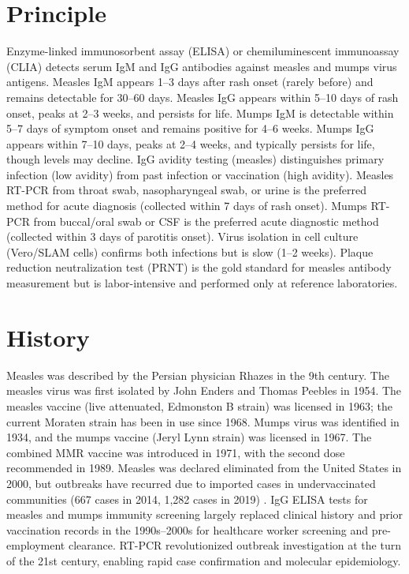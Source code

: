 \section*{Principle}
Enzyme-linked immunosorbent assay (ELISA) or chemiluminescent immunoassay (CLIA) detects serum IgM and IgG antibodies against measles and mumps virus antigens. Measles IgM appears 1--3 days after rash onset (rarely before) and remains detectable for 30--60 days. Measles IgG appears within 5--10 days of rash onset, peaks at 2--3 weeks, and persists for life. Mumps IgM is detectable within 5--7 days of symptom onset and remains positive for 4--6 weeks. Mumps IgG appears within 7--10 days, peaks at 2--4 weeks, and typically persists for life, though levels may decline. IgG avidity testing (measles) distinguishes primary infection (low avidity) from past infection or vaccination (high avidity). Measles RT-PCR from throat swab, nasopharyngeal swab, or urine is the preferred method for acute diagnosis (collected within 7 days of rash onset). Mumps RT-PCR from buccal/oral swab or CSF is the preferred acute diagnostic method (collected within 3 days of parotitis onset). Virus isolation in cell culture (Vero/SLAM cells) confirms both infections but is slow (1--2 weeks). Plaque reduction neutralization test (PRNT) is the gold standard for measles antibody measurement but is labor-intensive and performed only at reference laboratories.

\section*{History}
Measles was described by the Persian physician Rhazes in the 9th century. The measles virus was first isolated by John Enders and Thomas Peebles in 1954. The measles vaccine (live attenuated, Edmonston B strain) was licensed in 1963; the current Moraten strain has been in use since 1968. Mumps virus was identified in 1934, and the mumps vaccine (Jeryl Lynn strain) was licensed in 1967. The combined MMR vaccine was introduced in 1971, with the second dose recommended in 1989. Measles was declared eliminated from the United States in 2000, but outbreaks have recurred due to imported cases in undervaccinated communities (667 cases in 2014, 1,282 cases in 2019) \cite{rota2016measles}. IgG ELISA tests for measles and mumps immunity screening largely replaced clinical history and prior vaccination records in the 1990s--2000s for healthcare worker screening and pre-employment clearance. RT-PCR revolutionized outbreak investigation at the turn of the 21st century, enabling rapid case confirmation and molecular epidemiology.


